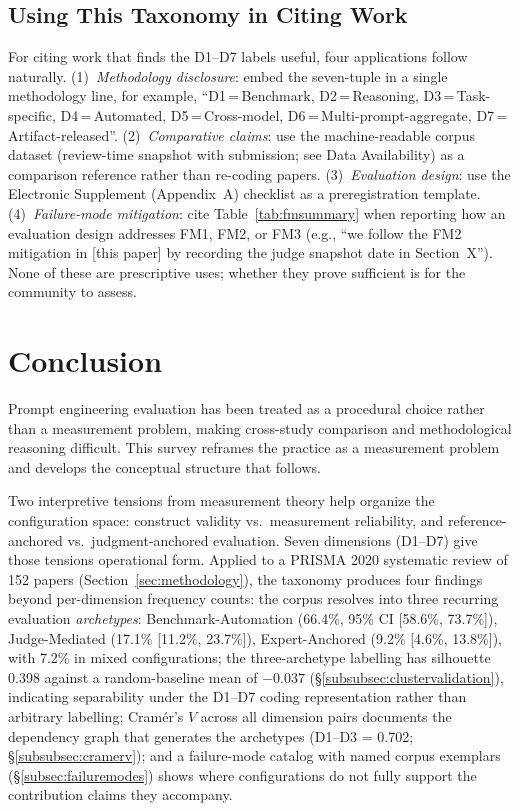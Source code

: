 \documentclass[acmsmall, nonacm, screen]{acmart}
\begin{document}
\subsection{Using This Taxonomy in Citing Work}
\label{subsec:using}

For citing work that finds the D1--D7 labels useful, four
applications follow naturally.
(1)~\emph{Methodology disclosure}: embed the seven-tuple in a single
methodology line, for example,
``D1\,=\,Benchmark, D2\,=\,Reasoning, D3\,=\,Task-specific,
D4\,=\,Automated, D5\,=\,Cross-model,
D6\,=\,Multi-prompt-aggregate, D7\,=\,Artifact-released''.
(2)~\emph{Comparative claims}: use the machine-readable corpus
dataset (review-time snapshot with submission; see Data Availability)
as a comparison reference rather than re-coding papers.
(3)~\emph{Evaluation design}: use the Electronic Supplement
(Appendix~A) checklist as a preregistration template.
(4)~\emph{Failure-mode mitigation}: cite Table~\ref{tab:fmsummary}
when reporting how an evaluation design addresses FM1, FM2, or FM3
(e.g., ``we follow the FM2 mitigation in [this paper] by recording
the judge snapshot date in Section~X''). None of these are
prescriptive uses; whether they prove sufficient is for the community
to assess.


\section{Conclusion}
\label{sec:conclusion}

Prompt engineering evaluation has been treated as a procedural
choice rather than a measurement problem, making cross-study
comparison and methodological reasoning difficult. This survey
reframes the practice as a measurement problem and develops the
conceptual structure that follows.

Two interpretive tensions from measurement theory help organize the
configuration space: construct validity vs.\ measurement reliability,
and reference-anchored vs.\ judgment-anchored evaluation. Seven
dimensions (D1--D7) give those tensions operational form. Applied
to a PRISMA 2020 systematic review of 152 papers
(Section~\ref{sec:methodology}), the taxonomy produces four findings
beyond per-dimension frequency counts: the corpus resolves into three
recurring evaluation \textit{archetypes}: Benchmark-Automation
(66.4\%, 95\% CI [58.6\%, 73.7\%]), Judge-Mediated (17.1\%
[11.2\%, 23.7\%]), Expert-Anchored (9.2\% [4.6\%, 13.8\%]), with
7.2\% in mixed configurations; the three-archetype labelling has
silhouette 0.398 against a random-baseline mean of $-0.037$
(§\ref{subsubsec:clustervalidation}),
indicating separability under the D1--D7 coding representation
rather than arbitrary labelling; Cram\'er's $V$
across all dimension pairs documents the dependency graph that
generates the archetypes (D1--D3 = 0.702;
§\ref{subsubsec:cramerv}); and a failure-mode catalog with named
corpus exemplars (§\ref{subsec:failuremodes}) shows where
configurations do not fully support the contribution claims they
accompany.
\end{document}
